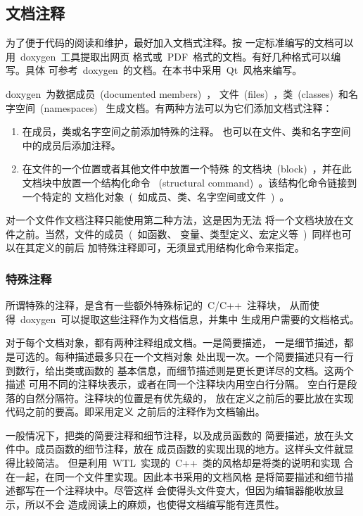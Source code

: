 \subsection{文档注释}

为了便于代码的阅读和维护，最好加入文档式注释。按
一定标准编写的文档可以用~doxygen~工具提取出网页
格式或~PDF~格式的文档。有好几种格式可以编写。具体
可参考~doxygen~的文档。在本书中采用~Qt~风格来编写。

doxygen~为数据成员~(documented members)~，
文件~(files)~，类~(classes)~和名字空间~(namespaces)~
生成文档。有两种方法可以为它们添加文档式注释：

\begin{enumerate}
    \item 在成员，类或名字空间之前添加特殊的注释。
也可以在文件、类和名字空间中的成员后添加注释。

    \item 在文件的一个位置或者其他文件中放置一个特殊
的文档块~(block)~，并在此文档块中放置一个结构化命令
~(structural command)~。该结构化命令链接到一个特定的
文档化对象~(~如成员、类、名字空间或文件~)~。
\end{enumerate}

对一个文件作文档注释只能使用第二种方法，这是因为无法
将一个文档块放在文件之前。当然，文件的成员~(~如函数、
变量、类型定义、宏定义等~)~同样也可以在其定义的前后
加特殊注释即可，无须显式用结构化命令来指定。

\subsubsection{特殊注释}

所谓特殊的注释，是含有一些额外特殊标记的~C/C++~注释块，
从而使得~doxygen~可以提取这些注释作为文档信息，并集中
生成用户需要的文档格式。

对于每个文档对象，都有两种注释组成文档。一是简要描述，
一是细节描述，都是可选的。每种描述最多只在一个文档对象
处出现一次。一个简要描述只有一行到数行，给出类或函数的
基本信息，而细节描述则是更长更详尽的文档。这两个描述
可用不同的注释块表示，或者在同一个注释块内用空白行分隔。
空白行是段落的自然分隔符。注释块的位置是有优先级的，
放在定义之前后的要比放在实现代码之前的要高。即采用定义
之前后的注释作为文档输出。

一般情况下，把类的简要注释和细节注释，以及成员函数的
简要描述，放在头文件中。成员函数的细节注释，放在
成员函数的实现出现的地方。这样头文件就显得比较简洁。
但是利用~WTL~实现的~C++~类的风格却是将类的说明和实现
合在一起，在同一个文件里实现。因此本书采用的文档风格
是将简要描述和细节描述都写在一个注释块中。尽管这样
会使得头文件变大，但因为编辑器能收放显示，所以不会
造成阅读上的麻烦，也使得文档编写能有连贯性。

